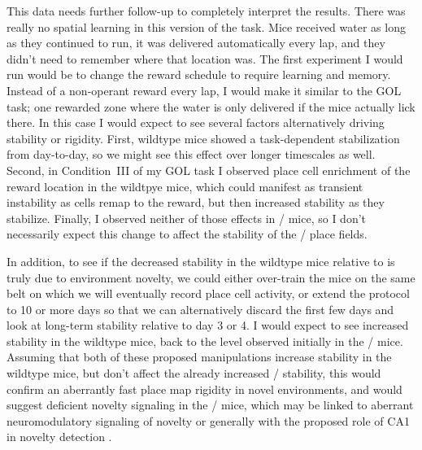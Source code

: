 This data needs further follow-up to completely interpret the results.
There was really no spatial learning in this version of the task.
Mice received water as long as they continued to run, it was delivered automatically every lap, and they didn't need to remember where that location was.
The first experiment I would run would be to change the reward schedule to require learning and memory.
Instead of a non-operant reward every lap, I would make it similar to the \ac{GOL} task; one rewarded zone where the water is only delivered if the mice actually lick there.
In this case I would expect to see several factors alternatively driving stability or rigidity.
First, wildtype mice showed a task-dependent stabilization from day-to-day, so we might see this effect over longer timescales as well.
Second, in Condition~III of my \ac{GOL} task I observed place cell enrichment of the reward location in the wildtpye mice, which could manifest as transient instability as cells remap to the reward, but then increased stability as they stabilize.
Finally, I observed neither of those effects in \df/ mice, so I don't necessarily expect this change to affect the stability of the \df/ place fields.

In addition, to see if the decreased stability in the wildtype mice relative to \citeauthor{Ziv2013} is truly due to environment novelty, we could either over-train the mice on the same belt on which we will eventually record place cell activity, or extend the protocol to 10 or more days so that we can alternatively discard the first few days and look at long-term stability relative to day 3 or 4.
I would expect to see increased stability in the wildtype mice, back to the level observed initially in the \df/ mice.
Assuming that both of these proposed manipulations increase stability in the wildtype mice, but don't affect the already increased \df/ stability, this would confirm an aberrantly fast place map rigidity in novel environments, and would suggest deficient novelty signaling in the \df/ mice, which may be linked to aberrant neuromodulatory signaling of novelty or generally with the proposed role of CA1 in novelty detection \citep{Li2003d, Barry2012c, Larkin2014, Nitz2004}.

